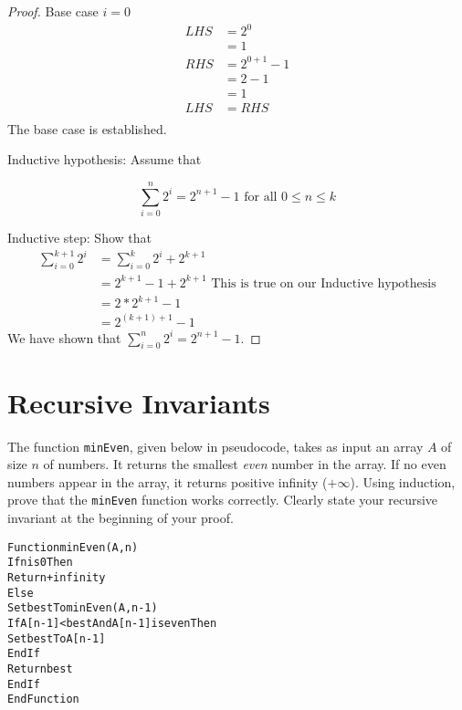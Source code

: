 \documentclass{article}
\begin{document}
    \begin{proof}

      Base case $i = 0$
      \begin{align*} 
        LHS &=  2^0 \\ 
         &=  1\\
        RHS &= 2^{0+1}-1\\
        &= 2-1\\
        &= 1\\
        LHS &= RHS\\
        \end{align*}
    The base case is established.

    Inductive hypothesis: Assume that
      
      \[ \sum\limits_{i=0}^{n} 2^i = 2^{n+1} - 1 \mbox{ for all $0 \leq n \leq k$}\]
     
    Inductive step: Show that
      \begin{align*} 
        \sum\limits_{i=0}^{k+1} 2^i &= \sum\limits_{i=0}^{k} 2^i + 2^{k+1}\\ 
         &=  2^{k+1} - 1 +  2^{k+1}\mbox{ This is true on our Inductive hypothesis}\\
         &= 2*2^{k+1} - 1\\
         &= 2^{(k+1)+1} - 1
        \end{align*}
    We have shown that $\sum\limits_{i=0}^{n} 2^i = 2^{n+1} - 1$.
  
  \end{proof}


    \vspace{1cm}
    \section{Recursive Invariants}
    
    The function \texttt{minEven}, given below in pseudocode, takes as
    input an array $A$ of size $n$ of numbers.  It returns the
    smallest \emph{even} number in the array.  If no even numbers
    appear in the array, it returns positive infinity ($+\infty$).
    Using induction, prove that the \texttt{minEven} function works
    correctly.  Clearly state your recursive invariant at the
    beginning of your proof.

    \begin{alltt}
Function minEven(A,n)
  If n is 0 Then
    Return +infinity
  Else
    Set best To minEven(A,n-1)
    If A[n-1] < best And A[n-1] is even Then
      Set best To A[n-1]
    EndIf
    Return best
  EndIf
EndFunction
    \end{alltt}
\end{document}
